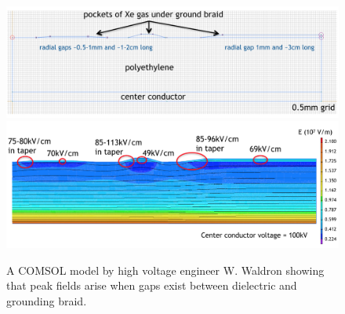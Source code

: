 \begin{figure}[htbp]
\begin{center}
\includegraphics[width=\textwidth]{figures/testbed/will_comsol_1.png}\\
\includegraphics[width=\textwidth]{figures/testbed/will_comsol_2.png}

\caption{A COMSOL model by high voltage engineer W. Waldron showing that peak fields arise when gaps exist between dielectric and grounding braid.}
\label{fig:will_comsol}
\end{center}
\end{figure}



